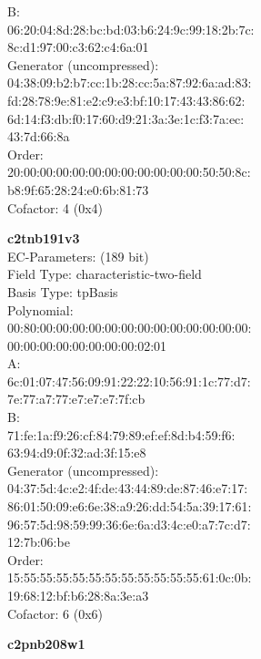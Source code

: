 B:   \\
    06:20:04:8d:28:bc:bd:03:b6:24:9c:99:18:2b:7c:\\
    8c:d1:97:00:c3:62:c4:6a:01\\
Generator (uncompressed):\\
    04:38:09:b2:b7:cc:1b:28:cc:5a:87:92:6a:ad:83:\\
    fd:28:78:9e:81:e2:c9:e3:bf:10:17:43:43:86:62:\\
    6d:14:f3:db:f0:17:60:d9:21:3a:3e:1c:f3:7a:ec:\\
    43:7d:66:8a\\
Order: \\
    20:00:00:00:00:00:00:00:00:00:00:00:50:50:8c:\\
    b8:9f:65:28:24:e0:6b:81:73\\
Cofactor:  4 (0x4)\\
\item \textbf{ c2tnb191v3 }\\
EC-Parameters: (189 bit)\\
Field Type: characteristic-two-field\\
Basis Type: tpBasis\\
Polynomial:\\
    00:80:00:00:00:00:00:00:00:00:00:00:00:00:00:\\
    00:00:00:00:00:00:00:00:02:01\\
A:   \\
    6c:01:07:47:56:09:91:22:22:10:56:91:1c:77:d7:\\
    7e:77:a7:77:e7:e7:e7:7f:cb\\
B:   \\
    71:fe:1a:f9:26:cf:84:79:89:ef:ef:8d:b4:59:f6:\\
    63:94:d9:0f:32:ad:3f:15:e8\\
Generator (uncompressed):\\
    04:37:5d:4c:e2:4f:de:43:44:89:de:87:46:e7:17:\\
    86:01:50:09:e6:6e:38:a9:26:dd:54:5a:39:17:61:\\
    96:57:5d:98:59:99:36:6e:6a:d3:4c:e0:a7:7c:d7:\\
    12:7b:06:be\\
Order: \\
    15:55:55:55:55:55:55:55:55:55:55:55:61:0c:0b:\\
    19:68:12:bf:b6:28:8a:3e:a3\\
Cofactor:  6 (0x6)\\
\item \textbf{ c2pnb208w1 }\\
